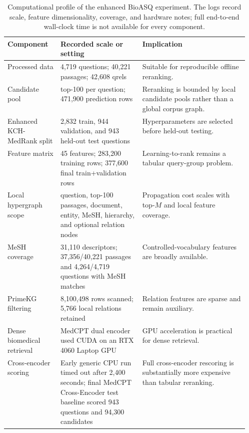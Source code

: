 \begin{table}[t]
\centering
\small
\caption{Computational profile of the enhanced BioASQ experiment. The logs record scale, feature dimensionality, coverage, and hardware notes; full end-to-end wall-clock time is not available for every component.}
\label{tab:efficiency-analysis}
\begin{tabularx}{\linewidth}{p{0.22\linewidth}p{0.34\linewidth}X}
\toprule
Component & Recorded scale or setting & Implication \\
\midrule
Processed data & 4,719 questions; 40,221 passages; 42,608 qrels & Suitable for reproducible offline reranking. \\
Candidate pool & top-100 per question; 471,900 prediction rows & Reranking is bounded by local candidate pools rather than a global corpus graph. \\
Enhanced KCH-MedRank split & 2,832 train, 944 validation, and 943 held-out test questions & Hyperparameters are selected before held-out testing. \\
Feature matrix & 45 features; 283,200 training rows; 377,600 final train+validation rows & Learning-to-rank remains a tabular query-group problem. \\
Local hypergraph scope & question, top-100 passages, document, entity, MeSH, hierarchy, and optional relation nodes & Propagation cost scales with top-$M$ and local feature coverage. \\
MeSH coverage & 31,110 descriptors; 37,356/40,221 passages and 4,264/4,719 questions with MeSH matches & Controlled-vocabulary features are broadly available. \\
PrimeKG filtering & 8,100,498 rows scanned; 5,766 local relations retained & Relation features are sparse and remain auxiliary. \\
Dense biomedical retrieval & MedCPT dual encoder used CUDA on an RTX 4060 Laptop GPU & GPU acceleration is practical for dense retrieval. \\
Cross-encoder scoring & Early generic CPU run timed out after 2,400 seconds; final MedCPT Cross-Encoder test baseline scored 943 questions and 94,300 candidates & Full cross-encoder rescoring is substantially more expensive than tabular reranking. \\
\bottomrule
\end{tabularx}
\end{table}
